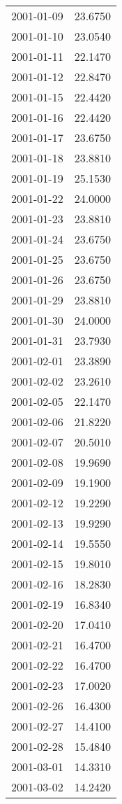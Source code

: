 \begin{tabular}{lr}
2001-01-09 &     23.6750 \\
2001-01-10 &     23.0540 \\
2001-01-11 &     22.1470 \\
2001-01-12 &     22.8470 \\
2001-01-15 &     22.4420 \\
2001-01-16 &     22.4420 \\
2001-01-17 &     23.6750 \\
2001-01-18 &     23.8810 \\
2001-01-19 &     25.1530 \\
2001-01-22 &     24.0000 \\
2001-01-23 &     23.8810 \\
2001-01-24 &     23.6750 \\
2001-01-25 &     23.6750 \\
2001-01-26 &     23.6750 \\
2001-01-29 &     23.8810 \\
2001-01-30 &     24.0000 \\
2001-01-31 &     23.7930 \\
2001-02-01 &     23.3890 \\
2001-02-02 &     23.2610 \\
2001-02-05 &     22.1470 \\
2001-02-06 &     21.8220 \\
2001-02-07 &     20.5010 \\
2001-02-08 &     19.9690 \\
2001-02-09 &     19.1900 \\
2001-02-12 &     19.2290 \\
2001-02-13 &     19.9290 \\
2001-02-14 &     19.5550 \\
2001-02-15 &     19.8010 \\
2001-02-16 &     18.2830 \\
2001-02-19 &     16.8340 \\
2001-02-20 &     17.0410 \\
2001-02-21 &     16.4700 \\
2001-02-22 &     16.4700 \\
2001-02-23 &     17.0020 \\
2001-02-26 &     16.4300 \\
2001-02-27 &     14.4100 \\
2001-02-28 &     15.4840 \\
2001-03-01 &     14.3310 \\
2001-03-02 &     14.2420 \\

\end{tabular}
